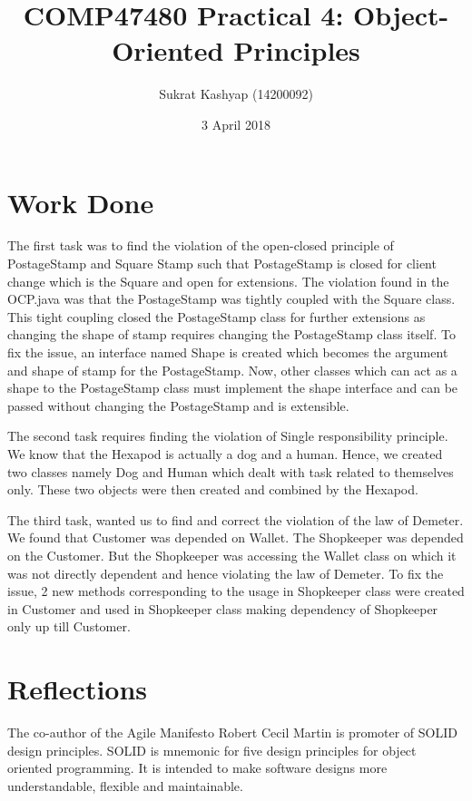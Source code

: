 \documentclass[12pt]{article}
\title{\vspace{-3.0cm}COMP47480 Practical 4: Object-Oriented Principles}
\author{Sukrat Kashyap (14200092)}
\date{3 April 2018}
\begin{document}
\maketitle

\section{Work Done}

The first task was to find the violation of the open-closed principle of PostageStamp and Square Stamp such that PostageStamp is closed for client change which is the Square and open for extensions. The violation found in the OCP.java was that the PostageStamp was tightly coupled with the Square class. This tight coupling closed the PostageStamp class for further extensions as changing the shape of stamp requires changing the PostageStamp class itself. To fix the issue, an interface named Shape is created which becomes the argument and shape of stamp for the PostageStamp. Now, other classes which can act as a shape to the PostageStamp class must implement the shape interface and can be passed without changing the PostageStamp and is extensible.

The second task requires finding the violation of Single responsibility principle. We know that the Hexapod is actually a dog and a human. Hence, we created two classes namely Dog and Human which dealt with task related to themselves only. These two objects were then created and combined by the Hexapod.

The third task, wanted us to find and correct the violation of the law of Demeter. We found that Customer was depended on Wallet. The Shopkeeper was depended on the Customer. But the Shopkeeper was accessing the Wallet class on which it was not directly dependent and hence violating the law of Demeter. To fix the issue, 2 new methods corresponding to the usage in Shopkeeper class were created in Customer and used in Shopkeeper class making dependency of Shopkeeper only up till Customer.

\section{Reflections}

The co-author of the Agile Manifesto Robert Cecil Martin is promoter of SOLID design principles. SOLID is mnemonic for five design principles for object oriented programming. It is intended to make software designs more understandable, flexible and maintainable.
\end{document}
